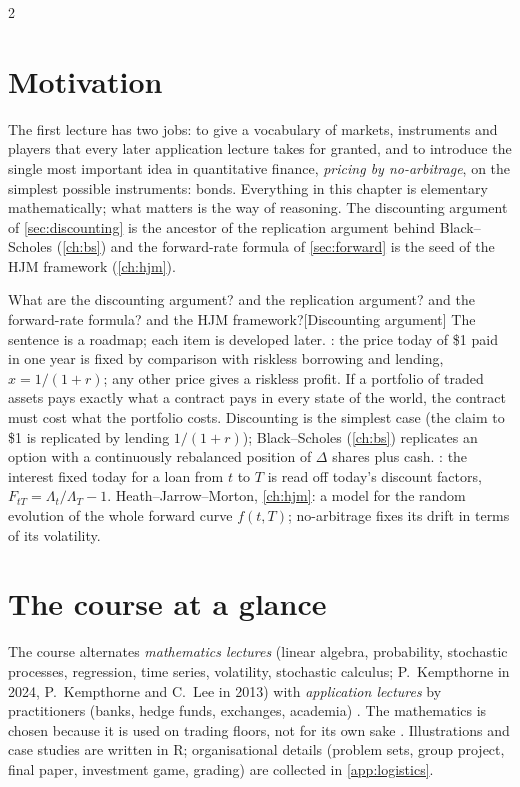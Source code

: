 \begin{paracol}{2}
\section*{Motivation}
The first lecture has two jobs: to give a vocabulary of markets, instruments and players that
every later application lecture takes for granted, and to introduce the single most important
idea in quantitative finance, \emph{pricing by no-arbitrage}, on the simplest possible
instruments: bonds. Everything in this chapter is elementary mathematically; what matters is
the way of reasoning. The discounting argument of \cref{sec:discounting} is the ancestor of
the replication argument behind Black--Scholes (\cref{ch:bs}) and the forward-rate formula
of \cref{sec:forward} is the seed of the HJM framework (\cref{ch:hjm}).
\begin{answer}{What are the discounting argument? and the replication argument? and the forward-rate formula? and the HJM framework?}[Discounting argument]
The sentence is a roadmap; each item is developed later.
: the price today of \$1 paid in one
        year is fixed by comparison with riskless borrowing and lending, $x=1/(1+r)$; any other
        price gives a riskless profit.
If a portfolio of traded assets pays exactly what a contract
        pays in every state of the world, the contract must cost what the portfolio costs.
        Discounting is the simplest case (the claim to \$1 is replicated by lending $1/(1+r)$);
        Black--Scholes (\cref{ch:bs}) replicates an option with a continuously rebalanced position
        of $\Delta$ shares plus cash.
: the interest fixed today for a loan
        from $t$ to $T$ is read off today's discount factors, $F_{tT}=\Lambda_t/\Lambda_T-1$.
Heath--Jarrow--Morton, \cref{ch:hjm}: a model for the random
        evolution of the whole forward curve $f(t,T)$; no-arbitrage fixes its drift in terms of its
        volatility.
\end{answer}

\section{The course at a glance}
The course alternates \emph{mathematics lectures} (linear algebra, probability, stochastic
processes, regression, time series, volatility, stochastic calculus; P.~Kempthorne in 2024,
P.~Kempthorne and C.~Lee in 2013) with \emph{application lectures} by practitioners
(banks, hedge funds, exchanges, academia) . The mathematics is chosen
because it is used on trading floors, not for its own sake .
Illustrations and case studies are written in R; organisational details (problem sets, group
project, final paper, investment game, grading) are collected in \cref{app:logistics}.



\end{paracol}
